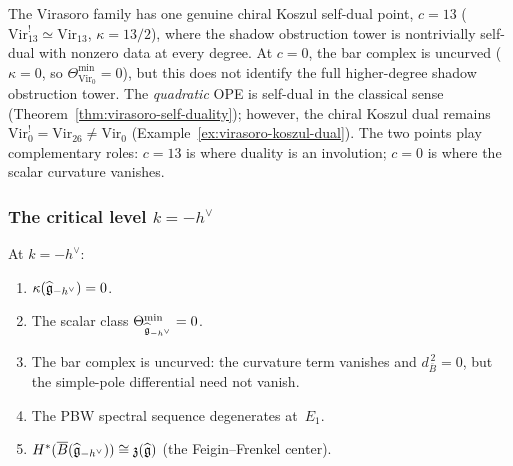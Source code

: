\begin{remark}[Chiral Koszul self-duality at $c = 13$ vs.\ quadratic self-duality at $c = 0$]
\label{rem:thqg-IV-c13-vs-c0}
The Virasoro family has one genuine chiral Koszul self-dual point,
$c = 13$ ($\mathrm{Vir}_{13}^! \simeq \mathrm{Vir}_{13}$,
$\kappa = 13/2$), where the shadow obstruction tower is nontrivially self-dual
with nonzero data at every degree.
At $c = 0$, the bar complex is uncurved
($\kappa = 0$, so $\Theta_{\mathrm{Vir}_0}^{\min} = 0$), but this
does not identify the full higher-degree shadow obstruction tower. The
\emph{quadratic} OPE is self-dual in
the classical sense
(Theorem~\ref{thm:virasoro-self-duality});
however, the chiral Koszul dual remains
$\mathrm{Vir}_0^! = \mathrm{Vir}_{26} \neq \mathrm{Vir}_0$
(Example~\ref{ex:virasoro-koszul-dual}).
The two points play complementary roles:
$c = 13$ is where duality is an involution;
$c = 0$ is where the scalar curvature vanishes.
\end{remark}

\subsubsection{The critical level \texorpdfstring{$k = -h^\vee$}{k = -h check}}

\begin{theorem}
\label{thm:thqg-IV-critical-degeneration}
At $k = -h^\vee$:
\begin{enumerate}[label=\textup{(\alph*)}]
\item $\kappa(\widehat{\mathfrak{g}}_{-h^\vee}) = 0$.
\item The scalar class
 $\Theta^{\min}_{\widehat{\mathfrak{g}}_{-h^\vee}} = 0$.
\item The bar complex is uncurved:
 the curvature term vanishes and $d_{\bar B}^{\,2} = 0$,
 but the simple-pole differential need not vanish.
\item The PBW spectral sequence degenerates at~$E_1$.
\item $H^*(\overline{B}(\widehat{\mathfrak{g}}_{-h^\vee}))
 \cong \mathfrak{z}(\widehat{\mathfrak{g}})$
 (the Feigin--Frenkel center).
\end{enumerate}
\end{theorem}

